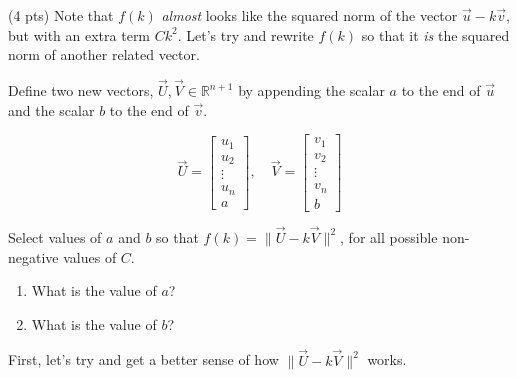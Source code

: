 \documentclass[11pt]{article}
\begin{document}
\begin{prob}[(13 pts)]


\begin{subprob}(4 pts) Note that $f(k)$ \textit{almost} looks like the squared norm of the vector $\vec u - k \vec v$, but with an extra term $C k^2$. Let's try and rewrite $f(k)$ so that it \textit{is} the squared norm of another related vector.

Define two new vectors, $\vec U, \vec V \in \mathbb R^{n+1}$ by appending the scalar $a$ to the end of $\vec u$ and the scalar $b$ to the end of $\vec v$.

$$\vec U = \begin{bmatrix} u_1 \\ u_2 \\ \vdots \\ u_n \\ a\end{bmatrix}, \quad \vec V = \begin{bmatrix} v_1 \\ v_2 \\ \vdots \\ v_n \\ b\end{bmatrix}$$

Select values of $a$ and $b$ so that $f(k) = \lVert \vec U - k \vec V \rVert^2$, for all possible non-negative values of $C$.

\begin{enumerate}[label=(\roman*)]
  \item What is the value of $a$?    
  \item What is the value of $b$?    
\end{enumerate}
\begin{solution}
First, let's try and get a better sense of how $\lVert \vec U - k \vec V \rVert^2$ works.


\end{solution}
\end{subprob}
\end{prob}
\end{document}
